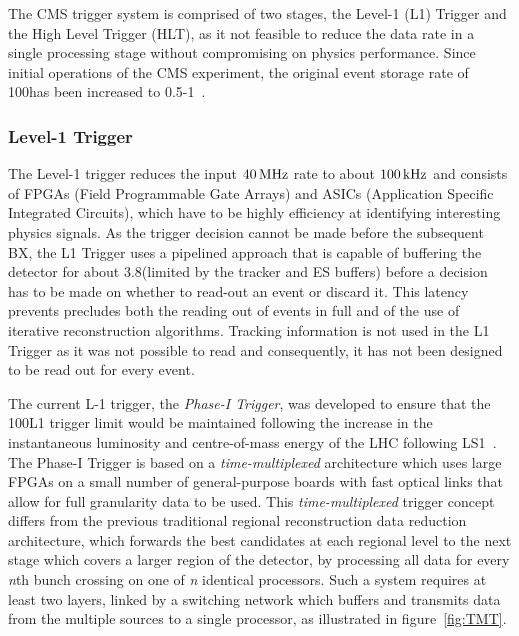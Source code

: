 The CMS trigger system is comprised of two stages, the Level-1 (L1) Trigger and the High Level Trigger (HLT), as it not feasible to reduce the data rate in a single processing stage without compromising on physics performance.
Since initial operations of the CMS experiment, the original event storage rate of 100\Hz has been increased to 0.5-1\kHz~\cite{Dasu:2000ge,phase1L1TDR}.

\subsubsection{Level-1 Trigger}\label{paragraph:L1}
The Level-1 trigger reduces the input $40\text{\,MHz}$ rate to about $100\text{\,kHz}$ and consists of FPGAs (Field Programmable Gate Arrays) and ASICs (Application Specific Integrated Circuits), which have to be highly efficiency at identifying interesting physics signals.
As the trigger decision cannot be made before the subsequent BX, the L1 Trigger uses a pipelined approach that is capable of buffering the detector for about 3.8\mus (limited by the tracker and ES buffers) before a decision has to be made on whether to read-out an event or discard it. 
This latency prevents precludes both the reading out of events in full and of the use of iterative reconstruction algorithms.
Tracking information is not used in the L1 Trigger as it was not possible to read  and consequently, it has not been designed to be read out for every event.


The current L-1 trigger, the \emph{Phase-I Trigger}, was developed to ensure that the 100\kHz L1 trigger limit would be maintained following the increase in the instantaneous luminosity and centre-of-mass energy of the LHC following LS1~\cite{Tapper:2013yva}.
The Phase-I Trigger is based on a \emph{time-multiplexed} architecture which uses large FPGAs on a small number of general-purpose boards with fast optical links that allow for full granularity data to be used.
This \emph{time-multiplexed} trigger concept differs from the previous traditional regional reconstruction data reduction architecture, which forwards the best candidates at each regional level to the next stage which covers a larger region of the detector, by processing all data for every \emph{n}th bunch crossing on one of \emph{n} identical processors.
Such a system requires at least two layers, linked by a switching network which buffers and transmits data from the multiple sources to a single processor, as illustrated in figure~\ref{fig:TMT}.

